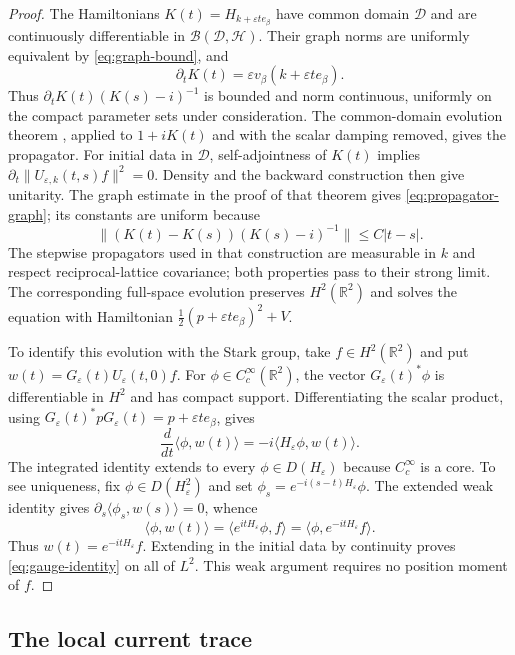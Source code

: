 \documentclass[11pt,a4paper]{article}
\newcommand{\R}{\mathbb R}
\newcommand{\HH}{\mathscr H}
\newcommand{\DD}{\mathscr D}
\newcommand{\ip}[2]{\langle #1,#2\rangle}
\newcommand{\norm}[1]{\lVert #1\rVert}
\numberwithin{equation}{section}
\begin{document}
\begin{proof}
The Hamiltonians $K(t)=H_{k+\varepsilon t e_\beta}$ have common domain
$\DD$ and are continuously differentiable in
$\mathcal B(\DD,\HH)$. Their graph norms are uniformly equivalent by
\eqref{eq:graph-bound}, and
\[
 \partial_t K(t)=\varepsilon v_\beta(k+\varepsilon t e_\beta).
\]
Thus $\partial_tK(t)(K(s)-i)^{-1}$ is bounded and norm continuous,
uniformly on the compact parameter sets under consideration. The
common-domain evolution theorem \cite[Theorem X.70]{RS2}, applied to
$1+iK(t)$ and with the scalar damping removed, gives the propagator.
For initial data in $\DD$, self-adjointness of $K(t)$ implies
$\partial_t\norm{U_{\varepsilon,k}(t,s)f}^2=0$. Density and the
backward construction then give unitarity.
The graph estimate in the proof of that theorem gives
\eqref{eq:propagator-graph}; its constants are uniform because
\[
 \norm{(K(t)-K(s))(K(s)-i)^{-1}}\leq C|t-s|.
\]
The stepwise propagators used in that construction are measurable in
$k$ and respect reciprocal-lattice covariance; both properties pass to
their strong limit.
The corresponding full-space evolution preserves $H^2(\R^2)$ and
solves the equation with Hamiltonian
$\tfrac12(p+\varepsilon t e_\beta)^2+V$.

To identify this evolution with the Stark group, take $f\in H^2(\R^2)$
and put $w(t)=G_\varepsilon(t)U_\varepsilon(t,0)f$. For
$\phi\in C_c^\infty(\R^2)$, the vector
$G_\varepsilon(t)^*\phi$ is differentiable in $H^2$ and has compact
support. Differentiating the scalar product, using
$G_\varepsilon(t)^*pG_\varepsilon(t)=p+\varepsilon t e_\beta$, gives
\begin{equation}\label{eq:weak-stark}
 \frac{d}{dt}\ip{\phi}{w(t)}
 =-i\ip{H_\varepsilon\phi}{w(t)}.
\end{equation}
The integrated identity extends to every $\phi\in D(H_\varepsilon)$
because $C_c^\infty$ is a core. To see uniqueness, fix
$\phi\in D(H_\varepsilon^2)$ and set
$\phi_s=e^{-i(s-t)H_\varepsilon}\phi$. The extended weak identity gives
$\partial_s\ip{\phi_s}{w(s)}=0$, whence
\[
 \ip{\phi}{w(t)}=\ip{e^{itH_\varepsilon}\phi}{f}
 =\ip{\phi}{e^{-itH_\varepsilon}f}.
\]
Thus $w(t)=e^{-itH_\varepsilon}f$. Extending in the initial data by
continuity proves \eqref{eq:gauge-identity} on all of $L^2$.
This weak argument requires no position moment of $f$.
\end{proof}

\subsection{The local current trace}
\end{document}
